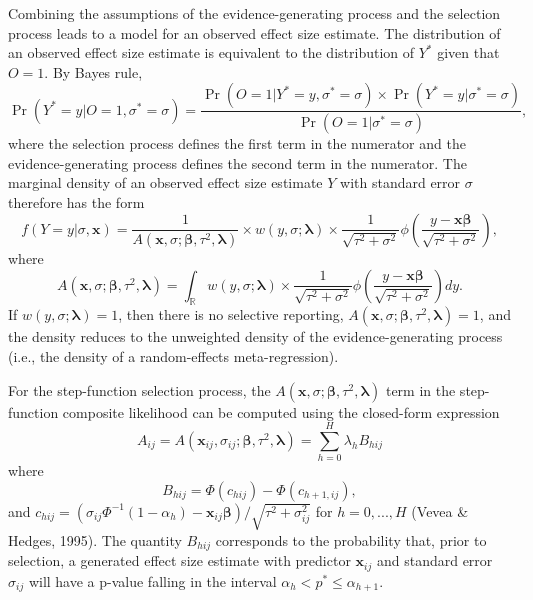 \documentclass[
  man, donotrepeattitle,floatsintext]{apa7}
\begin{document}
Combining the assumptions of the evidence-generating process and the selection process leads to a model for an observed effect size estimate. The distribution of an observed effect size estimate is equivalent to the distribution of \(Y^*\) given that \(O = 1\). By Bayes rule,
\[
\Pr(Y^* = y | O = 1, \sigma^* = \sigma) = \frac{\Pr(O = 1 | Y^* = y, \sigma^* = \sigma) \times \Pr(Y^* = y | \sigma^* = \sigma)}{\Pr(O = 1 | \sigma^* = \sigma)},
\]
where the selection process defines the first term in the numerator and the evidence-generating process defines the second term in the numerator. The marginal density of an observed effect size estimate \(Y\) with standard error \(\sigma\) therefore has the form
\begin{equation}
\label{eq:generic-selection}
f(Y = y | \sigma, \mathbf{x}) = \frac{1}{A(\mathbf{x}, \sigma; \boldsymbol\beta, \tau^2, \boldsymbol\lambda)} \times w\left(y, \sigma; \boldsymbol\lambda \right) \times \frac{1}{\sqrt{\tau^2 + \sigma^2}} \phi\left(\frac{y - \mathbf{x} \boldsymbol\beta}{\sqrt{\tau^2 + \sigma^2}}\right),
\end{equation}
where
\begin{equation}
\label{eq:generic-selection-A}
A(\mathbf{x}, \sigma; \boldsymbol\beta, \tau^2, \boldsymbol\lambda) =  \int_\mathbb{R} w\left(y, \sigma; \boldsymbol\lambda \right) \times  \frac{1}{\sqrt{\tau^2 + \sigma^2}}\phi\left(\frac{y - \mathbf{x}\boldsymbol\beta}{\sqrt{\tau^2 + \sigma^2}}\right) dy.
\end{equation}
If \(w(y, \sigma; \boldsymbol\lambda) = 1\), then there is no selective reporting, \(A(\mathbf{x}, \sigma; \boldsymbol\beta, \tau^2, \boldsymbol\lambda) = 1\), and the density reduces to the unweighted density of the evidence-generating process (i.e., the density of a random-effects meta-regression).

For the step-function selection process, the \(A(\mathbf{x}, \sigma; \boldsymbol\beta, \tau^2, \boldsymbol\lambda)\) term in the step-function composite likelihood can be computed using the closed-form expression
\begin{equation}
\label{eq:step-function-A}
A_{ij} = A(\mathbf{x}_{ij}, \sigma_{ij}; \boldsymbol\beta, \tau^2, \boldsymbol\lambda) = \sum_{h=0}^H \lambda_h B_{hij}
\end{equation}
where
\begin{equation}
\label{eq:step-function-Bhij}
B_{hij} = \Phi\left(c_{hij}\right) - \Phi\left(c_{h+1,ij}\right),
\end{equation}
and \(c_{hij} = \left(\sigma_{ij} \Phi^{-1}\left(1 - \alpha_h\right) - \mathbf{x}_{ij}\boldsymbol\beta\right) / \sqrt{\tau^2 + \sigma_{ij}^2}\) for \(h = 0,...,H\) (Vevea \& Hedges, 1995).
The quantity \(B_{hij}\) corresponds to the probability that, prior to selection, a generated effect size estimate with predictor \(\mathbf{x}_{ij}\) and standard error \(\sigma_{ij}\) will have a p-value falling in the interval \(\alpha_h < p^* \leq \alpha_{h+1}\).
\end{document}
